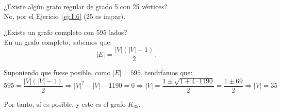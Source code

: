 \begin{ejercicio}\label{ej:1.11}
    ¿Existe algún grafo regular de grado 5 con 25 vértices?\\

    No, por el Ejericio~\ref{ej:1.6} (25 es impar).
\end{ejercicio}

\begin{ejercicio}\label{ej:1.12}
    ¿Existe un grafo completo con 595 lados?\\

    En un grafo completo, sabemos que:
    \begin{equation*}
        |E| = \frac{|V|(|V|-1)}{2}.
    \end{equation*}

    Suponiendo que fuese posible, como $|E|=595$, tendríamos que:
    \begin{equation*}
        595 = \frac{|V|(|V|-1)}{2} \Longrightarrow |V|^2 - |V| - 1190 = 0
        \Longrightarrow |V| = \frac{1\pm\sqrt{1+4\cdot 1190}}{2} = \frac{1\pm 69}{2}
        \Longrightarrow |V| = 35
    \end{equation*}

    Por tanto, sí es posible, y este es el grafo $K_{35}$.
\end{ejercicio}

